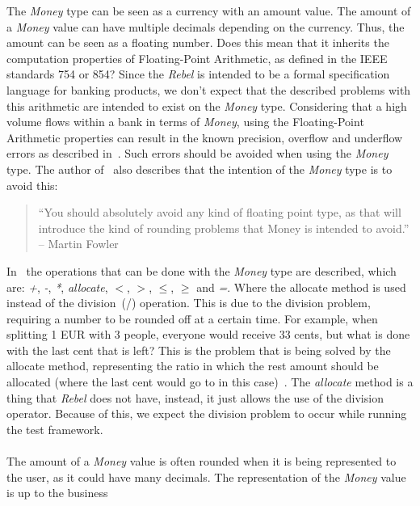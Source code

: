 The \textit{Money} type can be seen as a currency with an amount value. The
amount of a \textit{Money} value can have multiple decimals depending on the
currency. Thus, the amount can be seen as a floating number. Does this mean that
it inherits the computation properties of Floating-Point Arithmetic, as defined
in the IEEE standards 754 or 854? Since the \textit{Rebel} is intended to be a
formal specification language for banking products, we don't expect that the
described problems with this arithmetic are intended to exist on the
\textit{Money} type. Considering that a high volume flows within a bank in terms
of \textit{Money}, using the Floating-Point Arithmetic properties can result in
the known precision, overflow and underflow errors as described
in~\cite{goldberg1991every}. Such errors should be avoided when using the
\textit{Money} type. The author of~\cite{fowler2002patterns} also describes that
the intention of the \textit{Money} type is to avoid this:
\begin{quote}
	``You should absolutely avoid any kind of floating point type, as that will
	introduce the kind of rounding problems that Money is intended to avoid.''
    -- Martin Fowler~\cite{fowler2002patterns}
\end{quote}
%
In~\cite{fowler2002patterns} the operations that can be done with the
\textit{Money} type are described, which are: \textit{+}, \textit{-},
\textit{*}, \textit{allocate}, \textit{$<$}, \textit{$>$}, \textit{$\leq$},
\textit{$\geq$} and \textit{=}. Where the allocate method is used instead of the
division~(/) operation. This is due to the division problem, requiring a number
to be rounded off at a certain time. For example, when splitting 1 EUR with 3
people, everyone would receive 33 cents, but what is done with the last cent
that is left? This is the problem that is being solved by the allocate method,
representing the ratio in which the rest amount should be allocated (where the last
cent would go to in this case)~\cite{fowler2002patterns}. The \textit{allocate}
method is a thing that \textit{Rebel} does not have, instead, it just allows the
use of the division operator. Because of this, we expect the division problem to
occur while running the test framework.\\
\\
The amount of a \textit{Money} value is
often rounded when it is being represented to the user, as it could have many
decimals. The representation of the \textit{Money} value is up to the business
